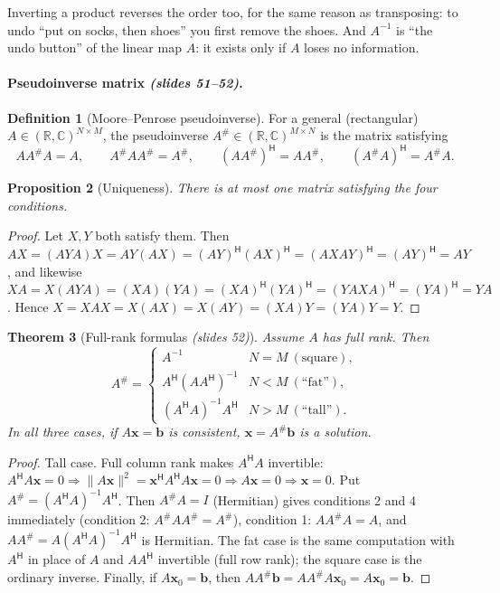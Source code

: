 \documentclass[11pt,a4paper]{article}
\newcommand{\R}{\mathbb{R}}
\newcommand{\C}{\mathbb{C}}
\newcommand{\Her}{^{\mathsf{H}}}
\newcommand{\pinv}{^{\#}}
\newcommand{\slides}[1]{\texorpdfstring{\emph{(slides #1)}}{(slides #1)}}
\theoremstyle{definition}
\newtheorem{definition}{Definition}[section]
\theoremstyle{plain}
\newtheorem{theorem}[definition]{Theorem}
\newtheorem{proposition}[definition]{Proposition}
\begin{document}
\begin{intuition}
Inverting a product reverses the order too, for the same reason as transposing: to undo ``put on socks, then shoes'' you first remove the shoes. And $A^{-1}$ is ``the undo button'' of the linear map $A$: it exists only if $A$ loses no information.
\end{intuition}

\paragraph{Pseudoinverse matrix \slides{51--52}.}
\begin{definition}[Moore--Penrose pseudoinverse]
For a general (rectangular) $A\in(\R,\C)^{N\times M}$, the pseudoinverse $A\pinv\in(\R,\C)^{M\times N}$ is the matrix satisfying
\[
AA\pinv A=A,\qquad A\pinv AA\pinv=A\pinv,\qquad (AA\pinv)\Her=AA\pinv,\qquad (A\pinv A)\Her=A\pinv A .
\]
\end{definition}

\begin{proposition}[Uniqueness]\label{prop:pinv-unique}
There is at most one matrix satisfying the four conditions.
\end{proposition}
\begin{proof}
Let $X,Y$ both satisfy them. Then $AX=(AYA)X=AY(AX)=(AY)\Her(AX)\Her=(AXAY)\Her=(AY)\Her=AY$, and likewise $XA=X(AYA)=(XA)(YA)=(XA)\Her(YA)\Her=(YAXA)\Her=(YA)\Her=YA$. Hence $X=XAX=X(AX)=X(AY)=(XA)Y=(YA)Y=Y$.
\end{proof}

\begin{theorem}[Full-rank formulas \slides{52}]\label{thm:pinv}
Assume $A$ has full rank. Then
\[
A\pinv=\begin{cases}A^{-1}&N=M\ (\text{square}),\\ A\Her(AA\Her)^{-1}&N<M\ (\text{``fat''}),\\ (A\Her A)^{-1}A\Her&N>M\ (\text{``tall''}).\end{cases}
\]
In all three cases, if $A\mathbf x=\mathbf b$ is consistent, $\mathbf x=A\pinv\mathbf b$ is a solution.
\end{theorem}
\begin{proof}
Tall case. Full column rank makes $A\Her A$ invertible: $A\Her A\mathbf x=0\Rightarrow\|A\mathbf x\|^2=\mathbf x\Her A\Her A\mathbf x=0\Rightarrow A\mathbf x=0\Rightarrow\mathbf x=0$. Put $A\pinv=(A\Her A)^{-1}A\Her$. Then $A\pinv A=I$ (Hermitian) gives conditions 2 and 4 immediately (condition 2: $A\pinv AA\pinv=A\pinv$), condition 1: $AA\pinv A=A$, and $AA\pinv=A(A\Her A)^{-1}A\Her$ is Hermitian. The fat case is the same computation with $A\Her$ in place of $A$ and $AA\Her$ invertible (full row rank); the square case is the ordinary inverse. Finally, if $A\mathbf x_0=\mathbf b$, then $AA\pinv\mathbf b=AA\pinv A\mathbf x_0=A\mathbf x_0=\mathbf b$.
\end{proof}
\end{document}
